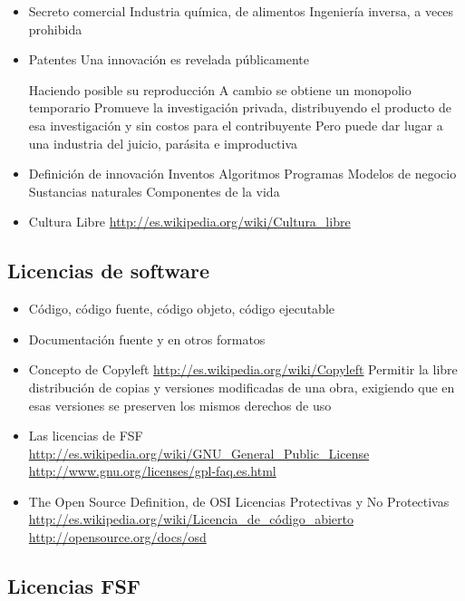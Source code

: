 \begin{itemize}
	\item Secreto comercial
		\subitem  Industria química, de alimentos
		\subitem  Ingeniería inversa, a veces prohibida
	\item Patentes
	\subitem   Una innovación es revelada públicamente

	\subitem  Haciendo posible su reproducción
 	\subitem   A cambio se obtiene un monopolio temporario
 		\subitem Promueve la investigación privada, distribuyendo el producto de esa investigación y sin costos para el contribuyente
 		\subitem Pero puede dar lugar a una industria del juicio, parásita e improductiva
 		\item Definición de innovación
 		\subitem     Inventos
 		\subitem    Algoritmos
 		\subitem    Programas
 		\subitem    Modelos de negocio
 		\subitem    Sustancias naturales
 		\subitem    Componentes de la vida
	\item Cultura Libre
	\subitem \url{http://es.wikipedia.org/wiki/Cultura_libre}

\end{itemize}

\subsection{Licencias de software}
\begin{itemize}
	\item Código, código fuente, código objeto, código ejecutable
	\item Documentación fuente y en otros formatos
	\item Concepto de Copyleft
	\subitem \url {http://es.wikipedia.org/wiki/Copyleft}
	\subitem Permitir la libre distribución de copias y versiones modificadas de una obra, exigiendo que en esas versiones se preserven los mismos derechos de uso
	\item Las licencias de FSF
	\subitem \url {http://es.wikipedia.org/wiki/GNU_General_Public_License}
	\subitem \url{http://www.gnu.org/licenses/gpl-faq.es.html}
	\item The Open Source Definition, de OSI
	\subitem Licencias Protectivas y No Protectivas
	\subitem \url{http://es.wikipedia.org/wiki/Licencia_de_código_abierto}
	\subitem \url{http://opensource.org/docs/osd}
\end {itemize}


\subsection {Licencias FSF}
